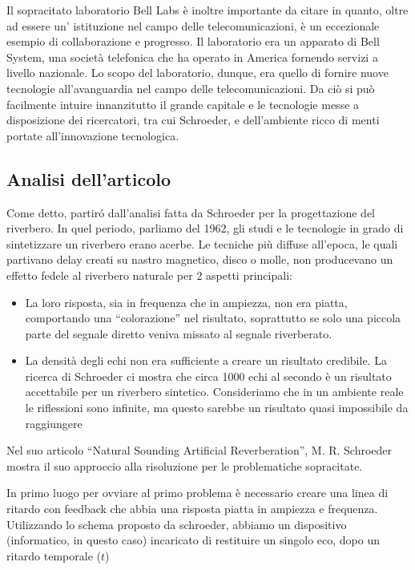 Il sopracitato laboratorio Bell Labs è inoltre importante da citare in quanto, oltre ad essere un’ istituzione nel campo delle telecomunicazioni, è un eccezionale esempio di collaborazione e progresso. Il laboratorio era un apparato di Bell System, una società telefonica che ha operato in America fornendo servizi a livello nazionale. Lo scopo del laboratorio, dunque, era quello di fornire nuove tecnologie all’avanguardia nel campo delle telecomunicazioni. Da ciò si può facilmente intuire innanzitutto il grande capitale e le tecnologie messe a disposizione dei ricercatori, tra cui Schroeder, e dell’ambiente ricco di menti portate all’innovazione tecnologica.

\subsection{Analisi dell'articolo}

Come detto, partiró dall’analisi fatta da Schroeder per la progettazione del riverbero.
In quel periodo, parliamo del 1962, gli studi e le tecnologie in grado di sintetizzare un riverbero erano acerbe.
Le tecniche più diffuse all’epoca, le quali partivano delay creati su nastro magnetico, disco o molle, non producevano un effetto fedele al riverbero naturale per 2 aspetti principali:

\begin{itemize}
\item La loro risposta, sia in frequenza che in ampiezza, non era piatta, comportando una “colorazione” nel risultato, soprattutto se solo una piccola parte del segnale diretto veniva missato al segnale riverberato.
\item La densità degli echi non era sufficiente a creare un risultato credibile. La ricerca di Schroeder ci mostra che circa 1000 echi al secondo è un risultato accettabile per un riverbero sintetico. Consideriamo che in un ambiente reale le riflessioni sono infinite, ma questo sarebbe un risultato quasi impossibile da raggiungere
\end{itemize}

Nel suo articolo “Natural Sounding Artificial Reverberation”, M. R. Schroeder mostra il suo approccio alla risoluzione per le problematiche sopracitate.

In primo luogo per ovviare al primo problema è necessario creare una linea di ritardo con feedback che abbia una risposta piatta in ampiezza e frequenza.
Utilizzando lo schema proposto da schroeder, abbiamo un dispositivo (informatico, in questo caso) incaricato di restituire un singolo eco, dopo un ritardo temporale ($t$)

